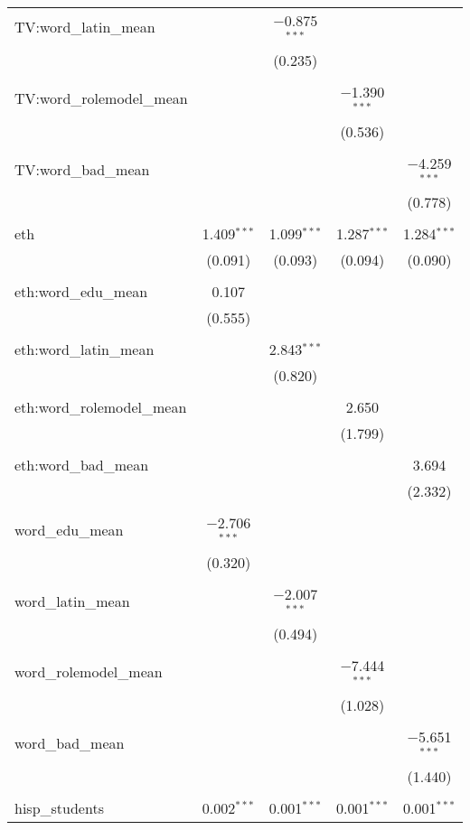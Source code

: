 \begin{table}[!htbp]
\begin{tabular}{@{\extracolsep{-2pt}}lcccc}
 TV:word\_latin\_mean &  & $-$0.875$^{***}$ &  &  \\ 
  &  & (0.235) &  &  \\ 
  & & & & \\ 
 TV:word\_rolemodel\_mean &  &  & $-$1.390$^{***}$ &  \\ 
  &  &  & (0.536) &  \\ 
  & & & & \\ 
 TV:word\_bad\_mean &  &  &  & $-$4.259$^{***}$ \\ 
  &  &  &  & (0.778) \\ 
  & & & & \\ 
 eth & 1.409$^{***}$ & 1.099$^{***}$ & 1.287$^{***}$ & 1.284$^{***}$ \\ 
  & (0.091) & (0.093) & (0.094) & (0.090) \\ 
  & & & & \\ 
 eth:word\_edu\_mean & 0.107 &  &  &  \\ 
  & (0.555) &  &  &  \\ 
  & & & & \\ 
 eth:word\_latin\_mean &  & 2.843$^{***}$ &  &  \\ 
  &  & (0.820) &  &  \\ 
  & & & & \\ 
 eth:word\_rolemodel\_mean &  &  & 2.650 &  \\ 
  &  &  & (1.799) &  \\ 
  & & & & \\ 
 eth:word\_bad\_mean &  &  &  & 3.694 \\ 
  &  &  &  & (2.332) \\ 
  & & & & \\ 
 word\_edu\_mean & $-$2.706$^{***}$ &  &  &  \\ 
  & (0.320) &  &  &  \\ 
  & & & & \\ 
 word\_latin\_mean &  & $-$2.007$^{***}$ &  &  \\ 
  &  & (0.494) &  &  \\ 
  & & & & \\ 
 word\_rolemodel\_mean &  &  & $-$7.444$^{***}$ &  \\ 
  &  &  & (1.028) &  \\ 
  & & & & \\ 
 word\_bad\_mean &  &  &  & $-$5.651$^{***}$ \\ 
  &  &  &  & (1.440) \\ 
  & & & & \\ 
 hisp\_students & 0.002$^{***}$ & 0.001$^{***}$ & 0.001$^{***}$ & 0.001$^{***}$ \\ 

\end{tabular}
\end{table}
